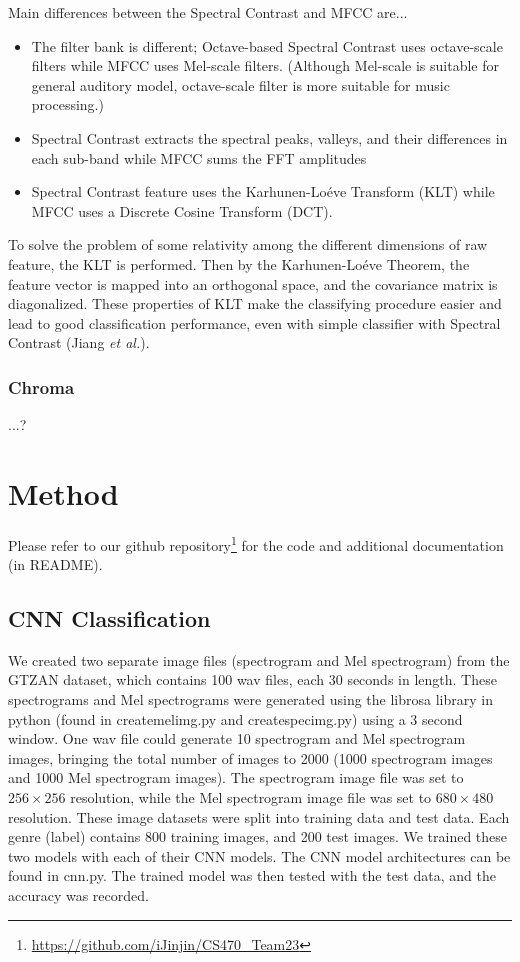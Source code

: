 \documentclass{article}
\theoremstyle{plain}
\theoremstyle{definition}
\theoremstyle{remark}
\begin{document}
Main differences between the Spectral Contrast and MFCC are...

\begin{itemize}
	\item The filter bank is different; Octave-based Spectral Contrast uses octave-scale filters while MFCC uses Mel-scale filters.
	(Although Mel-scale is suitable for general auditory model, octave-scale filter is more suitable for music processing.)
	
	\item Spectral Contrast extracts the spectral peaks, valleys, and their differences in each sub-band while MFCC sums the FFT amplitudes
	
	\item Spectral Contrast feature uses the Karhunen-Lo\'eve Transform (KLT) while MFCC uses a Discrete Cosine Transform (DCT).
\end{itemize}

To solve the problem of some relativity among the different dimensions of raw feature, the KLT is performed.
Then by the Karhunen-Lo\'eve Theorem, the feature vector is mapped into an orthogonal space, and the covariance matrix is diagonalized.
These properties of KLT make the classifying procedure easier and lead to good classification performance, even with simple classifier with Spectral Contrast (Jiang {\it et al.}).

\subsubsection{Chroma}
...?


\section{Method}

Please refer to our github repository\footnote{\url{https://github.com/iJinjin/CS470_Team23}} for the code and additional documentation (in README).

\subsection{CNN Classification}
We created two separate image files (spectrogram and Mel spectrogram) from the GTZAN dataset, which contains 100 wav files, each 30 seconds in length. These spectrograms and Mel spectrograms were generated using the librosa library in python (found in createmelimg.py and createspecimg.py) using a 3 second window. One wav file could generate 10 spectrogram and Mel spectrogram images, bringing the total number of images to 2000 (1000 spectrogram images and 1000 Mel spectrogram images). The spectrogram image file was set to $256 \times 256$ resolution, while the Mel spectrogram image file was set to $680 \times 480$ resolution. These image datasets were split into training data and test data. Each genre (label) contains 800 training images, and 200 test images. We trained these two models with each of their CNN models. The CNN model architectures can be found in cnn.py. The trained model was then tested with the test data, and the accuracy was recorded.  
\end{document}
